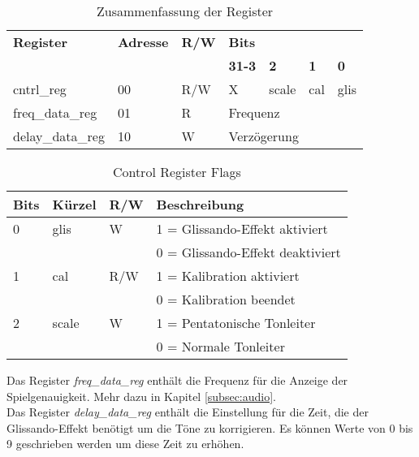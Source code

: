 \begin{table}[H]
	\centering
	\caption{Zusammenfassung der Register}
	\label{tab:Registers_pitch}
	\begin{tabular}{l|l|l|l|l|l|l}
		\textbf{Register} & \textbf{Adresse} & \textbf{R/W} &	\multicolumn{4}{l}{\textbf{Bits}} \\\cline{4-7}
						  &					 &				& \textbf{31-3}  & \textbf{2} & \textbf{1} & \textbf{0}\\ 
		\hline \hline
		
		cntrl\_reg & 00 & R/W & X & scale & cal & glis \\ 
		\hline
		freq\_data\_reg & 01 & R & \multicolumn{4}{l}{Frequenz} \\
		\hline
		delay\_data\_reg & 10 & W & \multicolumn{4}{l}{Verzögerung} \\
	\end{tabular}
\end{table}

\begin{table}[H]
	\centering
	\caption{Control Register Flags}
	\label{tab:Register_pitch_cntrl}
	\begin{tabular}{l|l|l|l}
		\textbf{Bits} & \textbf{Kürzel} & \textbf{R/W} &	\textbf{Beschreibung}\\
		\hline \hline
		
		0 & glis & W &  1 = Glissando-Effekt aktiviert \\ 
		  &      &   &  0 = Glissando-Effekt deaktiviert \\ 
		\hline
		1 & cal & R/W &  1 = Kalibration aktiviert \\ 
		  &     &     &  0 = Kalibration beendet \\ 
		\hline
		2 & scale & W &  1 = Pentatonische Tonleiter \\ 
		 &     &       &  0 = Normale Tonleiter \\ 
		\hline

	\end{tabular}
\end{table}

Das Register \textit{freq\_data\_reg} enthält die Frequenz für die Anzeige der Spielgenauigkeit. Mehr dazu in Kapitel \ref{subsec:audio}. \\
Das Register \textit{delay\_data\_reg} enthält die Einstellung für die Zeit, die der Glissando-Effekt benötigt um die Töne zu korrigieren. Es können Werte von 0 bis 9 geschrieben werden um diese Zeit zu erhöhen.

